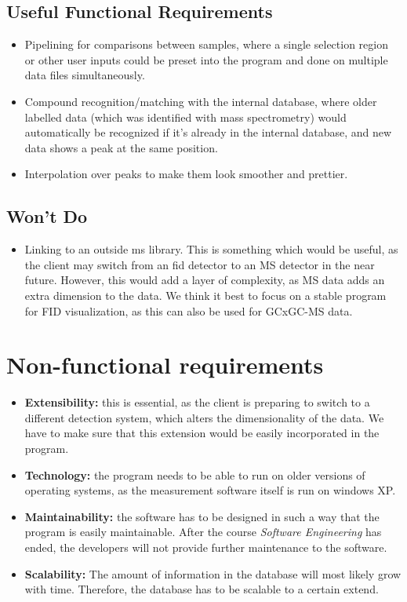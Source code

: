 \documentclass{article}
\begin{document}
\subsection*{Useful Functional Requirements}
\begin{itemize}
	\item Pipelining for comparisons between samples, where a single selection region or other user inputs could be preset into the program and done on multiple data files simultaneously.
	\item Compound recognition/matching with the internal database, where older labelled data (which was identified with mass spectrometry) would automatically be recognized if it's already in the internal database, and new data shows a peak at the same position.
	\item Interpolation over peaks to make them look smoother and prettier.  
\end{itemize}
\subsection*{Won't Do}
\begin{itemize}
	\item Linking to an outside \acrlong{ms}  library. This is something which would be useful, as the client may switch from an \acrfull{fid} detector to an MS detector in the near future. However, this would add a layer of complexity, as MS data adds an extra dimension to the data. We think it best to focus on a stable program for FID visualization, as this can also be used for GCxGC-MS data. 
\end{itemize}
\section{Non-functional requirements}
\begin{itemize}
	\item \textbf{Extensibility:} this is essential, as the client is preparing to switch to a different detection system, which alters the dimensionality of the data. We have to make sure that this extension would be easily incorporated in the program. 
	\item \textbf{Technology:} the program needs to be able to run on older versions of operating systems, as the measurement software itself is run on windows XP. 
	\item \textbf{Maintainability: } the software has to be designed in such a way that the program is easily  maintainable. After the course \textit{Software Engineering} has ended, the developers will not provide further maintenance to the software. 
	\item \textbf{Scalability: } The amount of information in the database will most likely grow with time. Therefore, the database has to be scalable to a certain extend. 
\end{itemize}
\printglossary[type =\acronymtype]
\end{document}
